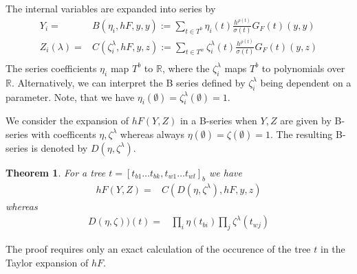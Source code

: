 \documentclass[english,unicode]{article}
\newcommand{\real}{\mathbb{R}}
\newtheorem{satz}{Theorem}[section]
\begin{document}
The internal variables are expanded into series by
\begin{align}
Y_i=&B(\eta_i,hF,y,y):=\sum_{t\in T^b} \eta_i(t) \frac{h^{\rho(t)}}{\sigma(t)}G_F(t)(y,y)\\
Z_i(\lambda)=&C(\zeta^{\lambda}_i,hF,y,z):=\sum_{t\in T^w} \zeta^{\lambda}_i(t) \frac{h^{\rho(t)}}{\sigma(t)} G_F(t)(y,z)\\
\end{align}
The series coefficients $\eta_i$  map $T^b$ to $\real$, where the $\zeta_i^{\lambda}$ maps $T^b$  to polynomials over $\real$. Alternatively, we can interpret the B series defined by $\zeta^{\lambda}_i$ being dependent on a parameter.
Note, that we have $\eta_i(\emptyset)=\zeta^{\lambda}_i(\emptyset)=1$.  
 
 We consider the expansion of $hF(Y,Z)$ in a B-series when $Y, Z$ are given by B-series with coefficents $\eta, \zeta^{\lambda}$ whereas always $\eta(\emptyset)=\zeta(\emptyset)=1$.
The resulting B-series is denoted by $D(\eta,\zeta^{\lambda})$.
\begin{satz}
For a tree $t= [t_{b1}\ldots t_{bk},t_{w1}\ldots t_{wl}]_b$ we have
\begin{align}
hF(Y,Z)=&C(D(\eta, \zeta^{\lambda}),hF,y,z)
\end{align}
whereas 
\begin{align}
D(\eta, \zeta))(t)=&\prod_i \eta(t_{bi}) \prod_j \zeta^{\lambda}(t_{wj})
\end{align}
\end{satz}
The proof requires only an exact calculation of the occurence of the tree $t$ in the Taylor expansion of $hF$.
\end{document}
